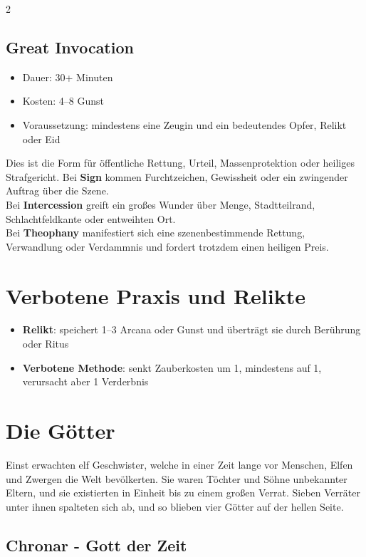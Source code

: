 \begin{multicols*}{2}
\subsection{Great Invocation}
\begin{itemize}[leftmargin=*]
\item Dauer: 30+ Minuten
\item Kosten: 4--8 Gunst
\item Voraussetzung: mindestens eine Zeugin und ein bedeutendes Opfer, Relikt oder Eid
\end{itemize}
Dies ist die Form für öffentliche Rettung, Urteil, Massenprotektion oder heiliges Strafgericht.
Bei \textbf{Sign} kommen Furchtzeichen, Gewissheit oder ein zwingender Auftrag über die Szene.\\
Bei \textbf{Intercession} greift ein großes Wunder über Menge, Stadtteilrand, Schlachtfeldkante oder entweihten Ort.\\
Bei \textbf{Theophany} manifestiert sich eine szenenbestimmende Rettung, Verwandlung oder Verdammnis und fordert trotzdem einen heiligen Preis.

\section{Verbotene Praxis und Relikte}
\begin{itemize}[leftmargin=*]
\item \textbf{Relikt}: speichert 1--3 Arcana oder Gunst und überträgt sie durch Berührung oder Ritus
\item \textbf{Verbotene Methode}: senkt Zauberkosten um 1, mindestens auf 1, verursacht aber 1 Verderbnis
\end{itemize}

\section{Die Götter}\label{sec:die-gotter}

Einst erwachten elf Geschwister, welche in einer Zeit lange vor Menschen, Elfen und Zwergen die Welt bevölkerten.
Sie waren Töchter und Söhne unbekannter Eltern, und sie existierten in Einheit bis zu einem großen Verrat.
Sieben Verräter unter ihnen spalteten sich ab, und so blieben vier Götter auf der hellen Seite.

\subsection{Chronar - Gott der Zeit}\label{subsec:chronar-gott-der-zeit}


\end{multicols*}
